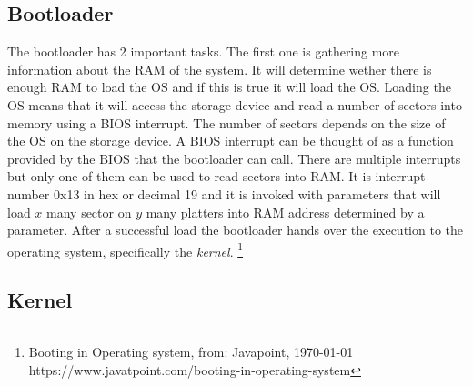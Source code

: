 \subsection{Bootloader}

The bootloader has 2 important tasks. The first one is gathering more
information about the RAM of the system. It will determine wether there is
enough RAM to load the OS and if this is true it will load the OS. Loading
the OS means that it will access the storage device and read a number of
sectors into memory using a BIOS interrupt. The number of sectors depends on
the size of the OS on the storage device. A BIOS interrupt can be thought of
as a function provided by the BIOS that the bootloader can call. There are
multiple interrupts but only one of them can be used to read sectors into
RAM. It is interrupt number 0x13 in hex or decimal 19 and it is invoked with parameters that will load $x$ many sector on $y$ many platters into RAM
address determined by a parameter. After a successful load the bootloader
hands over the execution to the operating system, specifically the \textit{kernel}. \footnote{Booting in Operating system, from: Javapoint, \today \\ https://www.javatpoint.com/booting-in-operating-system}

\subsection{Kernel}

